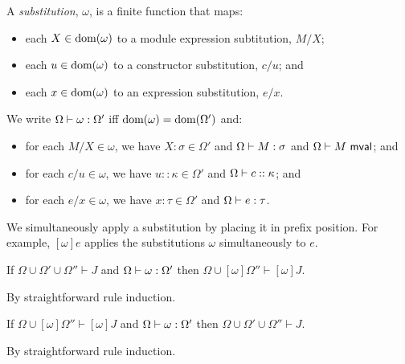 A \emph{substitution}, $\omega$, is a finite function that maps:
\begin{itemize}
\item each $X \in \text{dom}(\omega)$ to a module expression subtitution, $M/X$; 
\item each $u \in \text{dom}(\omega)$ to a constructor substitution, $c/u$; and 
\item each $x \in \text{dom}(\omega)$ to an expression substitution, $e/x$.
\end{itemize}

We write $\Omega \vdash \omega : \Omega'$ iff $\text{dom}(\omega)=\text{dom}(\Omega')$ and:
\begin{itemize}
\item for each $M/X \in \omega$, we have $X : \sigma \in \Omega'$ and $\Omega \vdash M : \sigma$ and $\Omega \vdash M~\mathsf{mval}$; and
\item for each $c/u \in \omega$, we have $u :: \kappa \in \Omega'$ and $\Omega \vdash c :: \kappa$; and 
\item for each $e/x \in \omega$, we have $x : \tau \in \Omega'$ and $\Omega \vdash e : \tau$.
\end{itemize}

We simultaneously apply a substitution by placing it in prefix position. For example, $[\omega]e$ applies the substitutions $\omega$ simultaneously to $e$.

\begin{lemma}[Substitution]\label{lemma:substitution-P} If $\Omega \cup \Omega' \cup \Omega'' \vdash J$ and $\Omega \vdash \omega : \Omega'$ then $\Omega \cup [\omega]\Omega'' \vdash [\omega]J$.
\end{lemma}
\begin{proof-sketch} By straightforward rule induction. 
\end{proof-sketch}

\begin{lemma}[Decomposition]\label{lemma:decomposition-P} 
If $\Omega \cup [\omega]\Omega'' \vdash [\omega]J$ and $\Omega \vdash \omega : \Omega'$ then $\Omega \cup \Omega' \cup \Omega'' \vdash J$.
\end{lemma}
\begin{proof-sketch} By straightforward rule induction.
\end{proof-sketch}


